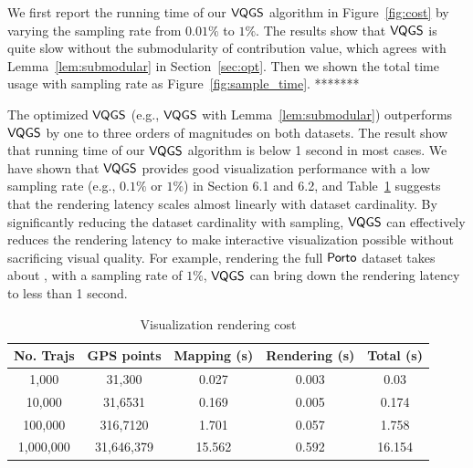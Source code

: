 We first report the running time of our $\mathsf{VQGS}$ algorithm in Figure~\ref{fig:cost} by varying the sampling rate from $0.01\%$ to $1\%$. The results show that $\mathsf{VQGS}$ is quite slow without the submodularity of contribution value, which agrees with Lemma~\ref{lem:submodular} in Section~\ref{sec:opt}.
Then we shown the total time usage with sampling rate as Figure~\ref{fig:sample_time}. {*******}

The optimized $\mathsf{VQGS}$ (e.g., $\mathsf{VQGS}$ with Lemma~\ref{lem:submodular}) outperforms $\mathsf{VQGS}$ by one to three orders of magnitudes on both datasets. The result show that running time of our $\mathsf{VQGS}$ algorithm is below 1 second in most cases. We have shown that $\mathsf{VQGS}$ provides good visualization performance with a low sampling rate (e.g., $0.1\%$ or $1\%$) in Section 6.1 and 6.2,  and Table~\ref{tab:gpu} suggests that the rendering latency scales almost linearly with dataset cardinality. By significantly reducing the dataset cardinality with sampling, $\mathsf{VQGS}$ can effectively reduces the rendering latency to make interactive visualization possible without sacrificing visual quality. For example, rendering the full $\textsf{Porto}{}$ dataset takes about , with a sampling rate of $1\%$, $\mathsf{VQGS}$ can bring down the rendering latency to less than 1 second.

\begin{table}
	\centering
	\small
	\caption{Visualization rendering cost}
	\begin{tabular}{|c|c|c|c|c|} \hline
		No. Trajs & GPS points & Mapping (s) & Rendering (s) & Total (s)\\ \hline
		1,000& 31,300 & 0.027 & 0.003 & 0.03 \\ \hline
		10,000& 31,6531 & 0.169 & 0.005 & 0.174\\ \hline
		100,000& 316,7120 & 1.701 & 0.057 & 1.758 \\ \hline
		1,000,000& 31,646,379 & 15.562 & 0.592 & 16.154 \\ \hline
	\end{tabular}	\label{tab:gpu}
\end{table}
